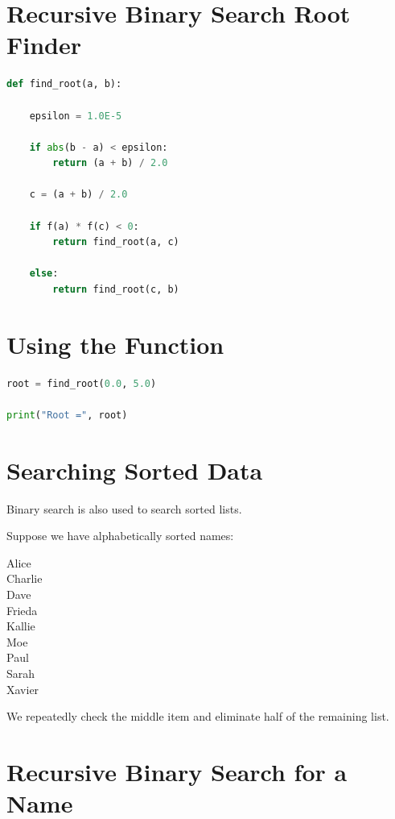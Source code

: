 \documentclass[11pt]{article}
\begin{document}
\section{Recursive Binary Search Root Finder}

\begin{lstlisting}[language=Python]
def find_root(a, b):

    epsilon = 1.0E-5

    if abs(b - a) < epsilon:
        return (a + b) / 2.0

    c = (a + b) / 2.0

    if f(a) * f(c) < 0:
        return find_root(a, c)

    else:
        return find_root(c, b)
\end{lstlisting}

\section{Using the Function}

\begin{lstlisting}[language=Python]
root = find_root(0.0, 5.0)

print("Root =", root)
\end{lstlisting}

\section{Searching Sorted Data}

Binary search is also used to search sorted lists.

Suppose we have alphabetically sorted names:

\begin{center}
Alice \\
Charlie \\
Dave \\
Frieda \\
Kallie \\
Moe \\
Paul \\
Sarah \\
Xavier
\end{center}

We repeatedly check the middle item and eliminate half of the remaining list.

\section{Recursive Binary Search for a Name}
\end{document}
